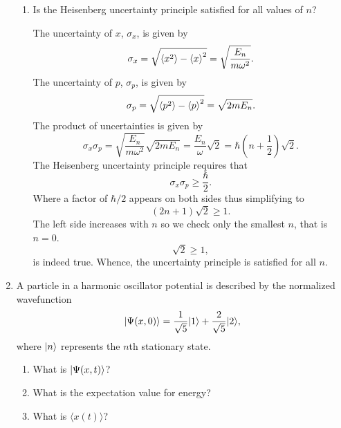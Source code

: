\documentclass[a4paper, 12pt]{config/homework}
\begin{document}
\begin{enumerate}
\begin{enumerate}[label=(\alph*)]
\item Is the Heisenberg uncertainty principle satisfied for all values of \(n\)?

The uncertainty of \(x\), \(\sigma_x\), is given by
\[\sigma_x = \sqrt{\expval{x^2} - \expval{x}^2} = \sqrt{\frac{E_n}{m\omega^2}}.\]
The uncertainty of \(p\), \(\sigma_p\), is given by
\[\sigma_p = \sqrt{\expval{p^2} - \expval{p}^2} = \sqrt{2mE_n}.\]
The product of uncertainties is given by
\[\sigma_x\sigma_p = \sqrt{\frac{E_n}{m\omega^2}}\sqrt{2mE_n} = \frac{E_n}{\omega}\sqrt{2} = \hbar\left(n+\frac{1}{2}\right)\sqrt{2}.\]
The Heisenberg uncertainty principle requires that
\[\sigma_x\sigma_p \ge \frac{\hbar}{2}.\]
Where a factor of \(\hbar/2\) appears on both sides thus simplifying to
\[\left(2n + 1\right)\sqrt{2} \ge 1.\]
The left side increases with \(n\) so we check only the smallest \(n\), that is \(n=0\).
\[\sqrt{2} \ge 1,\]
is indeed true. Whence, the uncertainty principle is satisfied for all \(n\).

\end{enumerate}

\pagebreak
\item A particle in a harmonic oscillator potential is described by the normalized wavefunction
\[\ket*{\Psi(x,0)} = \frac{1}{\sqrt{5}}\ket*{1} + \frac{2}{\sqrt{5}}\ket*{2},\]
where \(\ket*{n}\) represents the \(n\)th stationary state.
\begin{enumerate}[label=(\alph*)]
\item What is \(\ket*{\Psi(x,t)}\)?
\item What is the expectation value for energy?
\item What is \(\langle x(t) \rangle\)?
\end{enumerate}

\end{enumerate}
\end{document}
